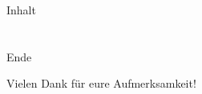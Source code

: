 \documentclass[12pt,hyperref={pdfpagelabels=false},notes=show,aspectratio=169]{beamer}
\begin{document}

\begin{frame}{Inhalt}
    \hspace{0.1\textwidth}
    \parbox[c][0.8\textheight][s]{0.8\textwidth}{
        \tableofcontents
    }
\end{frame}






\section*{}
\begin{frame}{Ende}
    \begin{center}
        Vielen Dank für eure Aufmerksamkeit!
     \end{center}
\end{frame}\addtocounter{framenumber}{-1}
\end{document}
